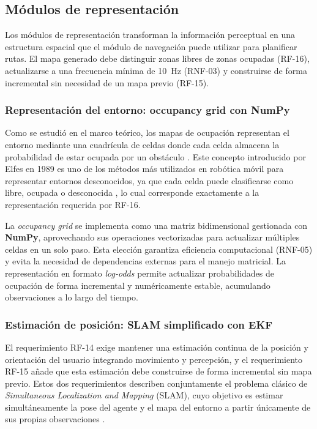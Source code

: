 \subsection{Módulos de representación}
Los módulos de representación transforman la información perceptual en una estructura
espacial que el módulo de navegación puede utilizar para planificar rutas. El mapa
generado debe distinguir zonas libres de zonas ocupadas (RF-16), actualizarse a una
frecuencia mínima de 10~Hz (RNF-03) y construirse de forma incremental sin necesidad
de un mapa previo (RF-15).

\subsubsection{Representación del entorno: occupancy grid con NumPy}

Como se estudió en el marco teórico, los mapas de ocupación representan el entorno
mediante una cuadrícula de celdas donde cada celda almacena la probabilidad de estar
ocupada por un obstáculo \cite{elfes1989}. Este concepto introducido por Elfes en 1989
es uno de los métodos más utilizados en robótica móvil para representar entornos
desconocidos, ya que cada celda puede clasificarse como libre, ocupada o desconocida
\cite{elfes1989}, lo cual corresponde exactamente a la representación requerida por
RF-16.

La \textit{occupancy grid} se implementa como una matriz bidimensional gestionada con
\textbf{NumPy}, aprovechando sus operaciones vectorizadas para actualizar múltiples
celdas en un solo paso. Esta elección garantiza eficiencia computacional (RNF-05) y
evita la necesidad de dependencias externas para el manejo matricial. La representación
en formato \textit{log-odds} permite actualizar probabilidades de ocupación de forma
incremental y numéricamente estable, acumulando observaciones a lo largo del tiempo.

\subsubsection{Estimación de posición: SLAM simplificado con EKF}

El requerimiento RF-14 exige mantener una estimación continua de la posición y
orientación del usuario integrando movimiento y percepción, y el requerimiento RF-15
añade que esta estimación debe construirse de forma incremental sin mapa previo. Estos
dos requerimientos describen conjuntamente el problema clásico de \textit{Simultaneous
Localization and Mapping} (SLAM), cuyo objetivo es estimar simultáneamente la pose del
agente y el mapa del entorno a partir únicamente de sus propias observaciones
\cite{wikipedia_slam}.

